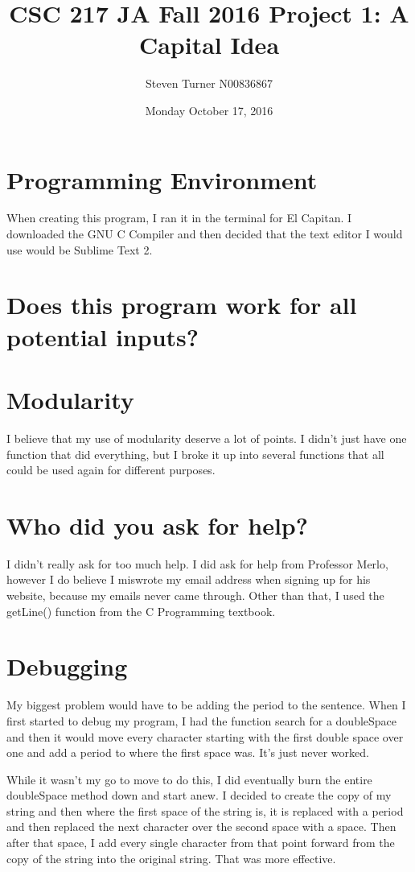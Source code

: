 \documentclass[11pt, oneside]{article}   	%
\title{CSC 217 JA Fall 2016 Project 1: A Capital Idea}
\author{Steven Turner N00836867}
\date{Monday October 17, 2016}							%
\begin{document}
\maketitle
\section{Programming Environment}
When creating this program, I ran it in the terminal for El Capitan. I downloaded the GNU C Compiler and then decided that the text editor I would use would be Sublime Text 2.

\section{Does this program work for all potential inputs?}

\section{Modularity}
I believe that my use of modularity deserve a lot of points. I didn't just have one function that did everything, but I broke it up into several functions that all could be used again for different purposes.

\section{Who did you ask for help?}
I didn't really ask for too much help. I did ask for help from Professor Merlo, however I do believe I miswrote my email address when signing up for his website, because my emails never came through. Other than that, I used the getLine() function from the C Programming textbook.

\section{Debugging}
My biggest problem would have to be adding the period to the sentence. When I first started to debug my program, I had the function search for a doubleSpace and then it would move every character starting with the first double space over one and add a period to where the first space was. It's just never worked.

While it wasn't my go to move to do this, I did eventually burn the entire doubleSpace method down and start anew. I decided to create the copy of my string and then where the first space of the string is, it is replaced with a period and then replaced the next character over the second space with a space. Then after that space, I add every single character from that point forward from the copy of the string into the original string. That was more effective. 
\end{document}
